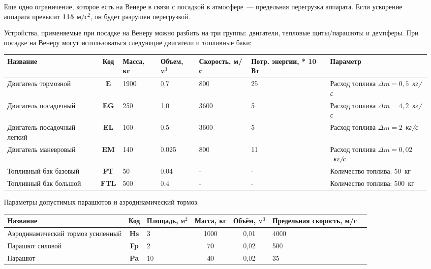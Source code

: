 \documentclass[12pt,a4paper]{article}
\begin{document}
Еще одно ограничение, которое есть на Венере в связи с посадкой в атмосфере~--- предельная
перегрузка аппарата. Если ускорение аппарата превысит \textbf{115 $\text{м}/\text{с}^2$},
он будет разрушен перегрузкой.

Устройства, применяемые при посадке на Венеру можно разбить на три группы: двигатели,
тепловые щиты/парашюты и демпферы. При посадке на Венеру могут использоваться следующие
двигатели и топливные баки:

\begin{center}
\begin{tabular}{ |p{2.5cm}|c|p{1.5cm}|p{1.5cm}|p{2cm}|p{2cm}|p{2.5cm}| } 
  \hline
  \textbf{Название} & \textbf{Код} & \textbf{Масса, кг} & \textbf{Объем, $\text{м}^3$} &
  \textbf{Скорость, м/с} & \textbf{Потр. энергии, * 10 Вт} & \textbf{Параметр}\\
  \hline
  Двигатель тормозной & \textbf{E} & 1900 & 0,7 & 800 & 25 & Расход топлива $\Delta m =
  0,5$~\emph{кг/с}\\
  \hline
  Двигатель посадочный & \textbf{EG} & 250 & 1,0 & 3600 & 5 & Расход топлива $\Delta m =
  4,2$~\emph{кг/с}\\
  \hline
  Двигатель посадочный легкий & \textbf{EL} & 100 & 0,5 & 3600 & 5 & Расход топлива $\Delta m =
  2$~\emph{кг/с}\\
  \hline
  Двигатель маневровый & \textbf{EM} & 140 & 0,025 & 800 & 11 & Расход топлива $\Delta m =
  0,02$~\emph{кг/с}\\
  \hline
  Топливный бак базовый & \textbf{FT} & 50 & 0,04 & - & - & Количество топлива: 50~кг\\
  \hline
  Топливный бак большой & \textbf{FTL} & 500 & 0,4 & - & - & Количество топлива: 500~кг\\
  \hline
\end{tabular}
\end{center}

Параметры допустимых парашютов и аэродинамический тормоз:

\begin{center}
\begin{tabular}{ |p{4cm}|c|p{2cm}|c|c|p{2cm}|p{2cm}| } 
  \hline
  \textbf{Название} & \textbf{Код} & \textbf{Площадь, $\text{м}^2$} & \textbf{Масса, кг} &
  \textbf{Объём, $\text{м}^3$} &\textbf{Пре\-дель\-ная скорость, м/с} \\
  \hline
  Аэродинамический тормоз усиленный & \textbf{Hs} & 3 & 1000 & 0,01 & 4000 \\
  \hline
  Парашют силовой & \textbf{Fp} & 2 & 70 & 0,02 & 500\\
  \hline
  Парашют & \textbf{Pa} & 10 & 40 & 0,02 & 35 \\
  \hline
\end{tabular}
\end{center}
\end{document}
